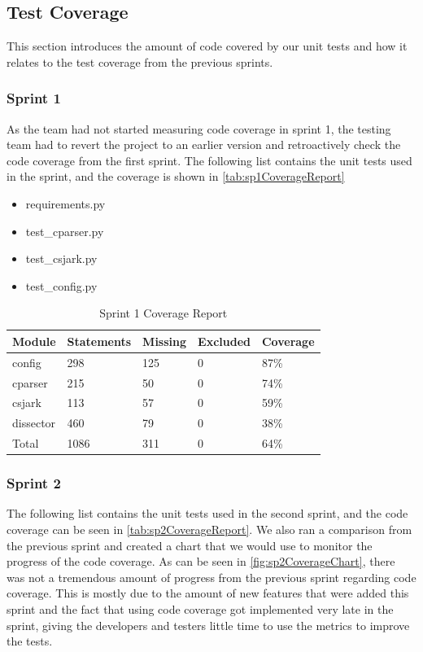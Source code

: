 \subsection{Test Coverage}
This section introduces the amount of code covered by our unit tests and how it relates to the test coverage from the previous sprints.

\subsubsection{Sprint 1}
As the team had not started measuring code coverage in sprint 1, the testing team had to revert the project to an earlier version and retroactively check the code coverage from the first sprint. The following list contains the unit tests used in the sprint, and the coverage is shown in \autoref{tab:sp1CoverageReport}

\begin{itemize}
\item requirements.py
\item test\_cparser.py
\item test\_csjark.py
\item test\_config.py
\end{itemize}

\begin{table}[!htb] \footnotesize \center
	\caption{Sprint 1 Coverage Report\label{tab:sp1CoverageReport}}
	\begin{tabular}{l l l l l}
		\toprule
		Module & Statements & Missing & Excluded & Coverage\\
		\midrule
		config & 298 & 125 & 0 & 87\%\ \\
		cparser & 215 & 50 & 0 & 74\%\ \\
		csjark & 113 & 57 & 0 & 59\%\ \\
		\gls{dissector} & 460 & 79 & 0 & 38\%\ \\
		Total & 1086 & 311 & 0 & 64\%\ \\
		\bottomrule
	\end{tabular}
\end{table}

\subsubsection{Sprint 2}
The following list contains the unit tests used in the second sprint, and the code coverage can be seen in \autoref{tab:sp2CoverageReport}. We also ran a comparison from the previous sprint and created a chart that we would use to monitor the progress of the code coverage. As can be seen in \autoref{fig:sp2CoverageChart}, there was not a tremendous amount of progress from the previous sprint regarding code coverage. This is mostly due to the amount of new features that were added this sprint and the fact that using code coverage got implemented very late in the sprint, giving the developers and testers little time to use the metrics to improve the tests.


